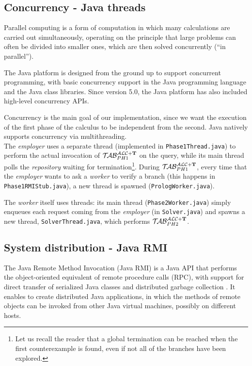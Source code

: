 \documentclass[a4paper, 11pt, oneside]{duthesis}
\newcommand{\tip}{{\bf T}}
\newcommand{\primo}{\mathrel{{\mathcal{T}\!\mathcal{AB}}}_{PH 1}^{\mathcal{ALC}+\mbox{\scriptsize $\tip$}}}
\newcommand{\secondo}{\mathrel{{\mathcal{T}\!\mathcal{AB}}}_{PH 2}^{\mathcal{ALC}+\mbox{\scriptsize $\tip$}}}
\begin{document}

\subsection{Concurrency - Java threads}
Parallel computing is a form of computation in which many calculations are carried out simultaneously, operating on the principle that large problems can often be divided into smaller ones, which are then solved concurrently (``in parallel'')\cite{Almasi:1989:HPC:160438}.

The Java platform is designed from the ground up to support concurrent programming, with basic concurrency support in the Java programming language and the Java class libraries. Since version 5.0, the Java platform has also included high-level concurrency APIs\cite{oracle_thread}.

Concurrency is the main goal of our implementation, since we want the execution of the first phase of the calculus to be independent from the second. Java natively supports concurrency via multithreading.\\

The \emph{employer} uses a separate thread (implemented in \verb$Phase1Thread.java$) to perform the actual invocation of $\primo$ on the query, while its main thread polls the \emph{repository} waiting for termination\footnote{Let us recall the reader that a global termination can be reached when the first counterexample is found, even if not all of the branches have been explored.}.
During $\primo$, every time that the \emph{employer} wants to ask a \emph{worker} to verify a branch (this happens in \verb$Phase1RMIStub.java$), a new thread is spawned (\verb$PrologWorker.java$).

The \emph{worker} itself uses threads: its main thread (\verb$Phase2Worker.java$) simply enqueues each request coming from the \emph{employer} (in \verb$Solver.java$) and spawns a new thread, \verb$SolverThread.java$, which performs $\secondo$.


\subsection{System distribution - Java RMI}


The Java Remote Method Invocation (Java RMI) is a Java API that performs the object-oriented equivalent of remote procedure calls (RPC), with support for direct transfer of serialized Java classes and distributed garbage collection \cite{wiki_rmi}.
It enables to create distributed Java applications, in which the methods of remote objects can be invoked from other Java virtual machines, possibly on different hosts\cite{oracle_rmi}.
\end{document}
